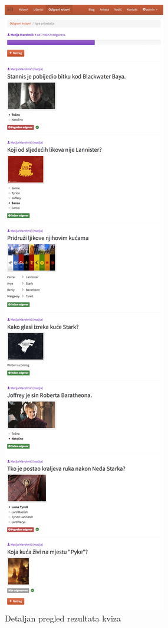 \documentclass[11pt]{scrreprt}
\begin{document}
\begin{figure}[H]
  \includegraphics[width=\textwidth, clip=true, trim=0 80cm 0 0, fbox]{school/played_quiz}
  \caption{Detaljan pregled rezultata kviza}
  \label{played_quiz}
\end{figure}
\end{document}
